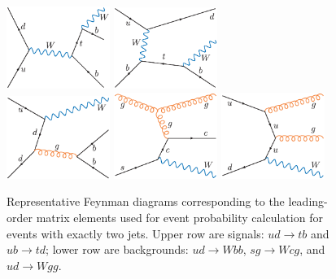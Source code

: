\begin{itemize}
\begin{figure}[!h!tbp]
\begin{center}
\includegraphics[width=0.30\textwidth]{eps/MatrixElement/feynman/tb}
\includegraphics[width=0.30\textwidth]{eps/MatrixElement/feynman/tq}\\
\includegraphics[width=0.30\textwidth]{eps/MatrixElement/feynman/wbb}
\includegraphics[width=0.30\textwidth]{eps/MatrixElement/feynman/wcg}
\includegraphics[width=0.30\textwidth]{eps/MatrixElement/feynman/wgg}
\caption{Representative Feynman diagrams corresponding to 
the leading-order matrix elements used for event probability
calculation for events with exactly two jets. Upper row are signals:
$ud{\rightarrow}tb$ and $ub{\rightarrow}td$; lower row are backgrounds: $ud{\rightarrow}Wbb$,
$sg{\rightarrow}Wcg$, and $ud{\rightarrow}Wgg$.}
\end{center}
\label{2jets}
\end{figure}


\end{itemize}
